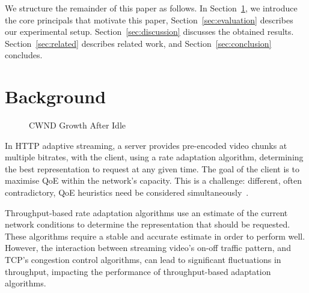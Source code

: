 \documentclass[10pt,sigconf,anonymous]{acmart}
\begin{document}
We structure the remainder of this paper as follows. In Section~\ref{sec:background}, we introduce the core principals that motivate this paper, Section~\ref{sec:evaluation} describes our experimental setup. Section~\ref{sec:discussion} discusses the obtained results. Section~\ref{sec:related} describes related work, and Section~\ref{sec:conclusion} concludes.

\section{Background}
\label{sec:background}

\begin{figure}
  \centering

    \caption{CWND Growth After Idle}
    \label{fig:cwnd-growth-after-idle}
\end{figure}


In HTTP adaptive streaming, a server provides pre-encoded video chunks at multiple bitrates, with the client, using a rate adaptation algorithm, determining the best representation to request at any given time. The goal of the client is to maximise QoE within the network's capacity. This is a challenge: different, often contradictory, QoE heuristics need be considered simultaneously~\cite{Seufert-2015-A-Survey-on-QoE-Dash}. 

Throughput-based rate adaptation algorithms use an estimate of the current network conditions to determine the representation that should be requested. These algorithms require a stable and accurate estimate in order to perform well. However, the interaction between streaming video's on-off traffic pattern, and TCP's congestion control algorithms, can lead to significant fluctuations in throughput, impacting the performance of throughput-based adaptation algorithms.
\end{document}
